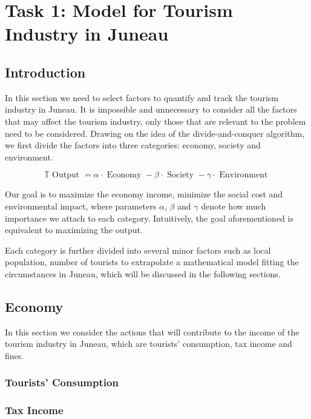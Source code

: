 \section{Task 1: Model for Tourism Industry in Juneau}

\subsection{Introduction}


In this section we need to select factors to quantify and track the tourism industry in Juneau. 
It is impossible and unnecessary to consider all the factors that may affect the 
tourism industry, only those that are relevant to the problem need to be considered.
Drawing on the idea of the divide-and-conquer algorithm, we first divide the factors 
into three categories: economy, society and environment. 


\begin{equation}
    \mathbb{T}\text { Output }=\alpha \cdot \text { Economy }-\beta \cdot \text { Society }-\gamma \cdot \text { Environment }
\end{equation}

Our goal is to maximize the economy income, minimize the social cost and environmental impact,
where parameters $\alpha$, $\beta$ and $\gamma$ denote how much importance we attach to each category.
Intuitively, the goal aforementioned is equivalent to maximizing the output.

Each category is further divided into several minor factors such as local population, 
number of tourists to extrapolate a mathematical model fitting the circumstances in Juneau,
which will be discussed in the following sections.





\subsection{Economy}

In this section we consider the actions that will contribute to the income of the tourism industry in Juneau, which are
tourists' consumption, tax income and fines.

\subsubsection{Tourists' Consumption}


\subsubsection{Tax Income}

